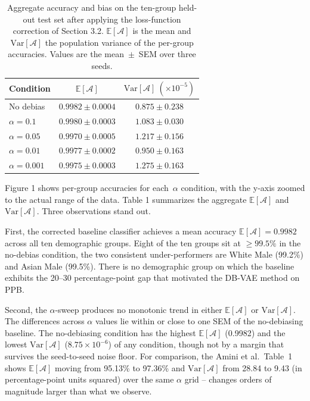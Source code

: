 \documentclass[10pt,twocolumn]{article}
\begin{document}
\begin{table}[H]
    \centering
    \small
    \caption{Aggregate accuracy and bias on the ten-group held-out test
    set after applying the loss-function correction of
    Section 3.2. $\mathbb{E}[\mathcal{A}]$ is the mean and
    $\mathrm{Var}[\mathcal{A}]$ the population variance of the per-group
    accuracies. Values are the mean~$\pm$~SEM over three seeds.}
    \label{tab:agg}
    \begin{tabular}{lcc}
        \toprule
        Condition & $\mathbb{E}[\mathcal{A}]$ & $\mathrm{Var}[\mathcal{A}]\ (\times 10^{-5})$ \\
        \midrule
        No debias       & $0.9982 \pm 0.0004$ & $0.875 \pm 0.238$ \\
        $\alpha = 0.1$  & $0.9980 \pm 0.0003$ & $1.083 \pm 0.030$ \\
        $\alpha = 0.05$ & $0.9970 \pm 0.0005$ & $1.217 \pm 0.156$ \\
        $\alpha = 0.01$ & $0.9977 \pm 0.0002$ & $0.950 \pm 0.163$ \\
        $\alpha = 0.001$& $0.9975 \pm 0.0003$ & $1.275 \pm 0.163$ \\
        \bottomrule
    \end{tabular}
\end{table}

Figure 1 shows per-group accuracies for
each~$\alpha$ condition, with the y-axis zoomed to the actual range of
the data. Table 1 summarizes the aggregate
$\mathbb{E}[\mathcal{A}]$ and $\mathrm{Var}[\mathcal{A}]$. Three
observations stand out.

First, the corrected baseline classifier achieves a mean accuracy
$\mathbb{E}[\mathcal{A}] = 0.9982$ across all ten demographic groups.
Eight of the ten groups sit at $\geq 99.5\%$ in the no-debias condition,
the two consistent under-performers are White Male (99.2\%) and Asian Male
(99.5\%). There is no demographic group on which the baseline exhibits the
20--30 percentage-point gap that motivated the DB-VAE method on PPB.

Second, the $\alpha$-sweep produces no monotonic trend in either
$\mathbb{E}[\mathcal{A}]$ or $\mathrm{Var}[\mathcal{A}]$. The differences
across $\alpha$ values lie within or close to one SEM of the no-debiasing
baseline. The no-debiasing condition has the highest
$\mathbb{E}[\mathcal{A}]$ (0.9982) and the lowest
$\mathrm{Var}[\mathcal{A}]$ ($8.75 \times 10^{-6}$) of any condition,
though not by a margin that survives the seed-to-seed noise floor. For
comparison, the Amini et al.\ Table~1 shows $\mathbb{E}[\mathcal{A}]$
moving from 95.13\% to 97.36\% and $\mathrm{Var}[\mathcal{A}]$ from 28.84
to 9.43 (in percentage-point units squared) over the same $\alpha$ grid --
changes orders of magnitude larger than what we observe.
\end{document}

